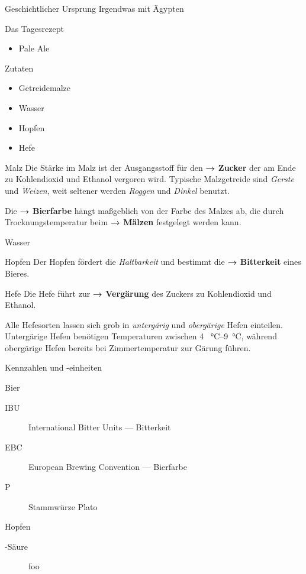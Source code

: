 \documentclass[9pt, ngerman]{beamer}
\newcommand{\forward}[1]{\textbf{→ #1}}
\begin{document}
\begin{frame}{Geschichtlicher Ursprung}
  Irgendwas mit Ägypten
\end{frame}
\begin{frame}{Das Tagesrezept}
  \begin{itemize}
    \item Pale Ale
  \end{itemize}
\end{frame}
\begin{frame}{Zutaten}
  \begin{itemize}
    \item Getreidemalze
    \item Wasser
    \item Hopfen
    \item Hefe
  \end{itemize}
\end{frame}
\begin{frame}{Malz}
  Die Stärke im Malz ist der Ausgangsstoff für den \forward{Zucker} der am Ende
  zu Kohlendioxid und Ethanol vergoren wird. Typische Malzgetreide sind
  \emph{Gerste} und \emph{Weizen}, weit seltener werden \emph{Roggen} und
  \emph{Dinkel} benutzt.

  Die \forward{Bierfarbe} hängt maßgeblich von der Farbe des Malzes ab, die
  durch Trocknungstemperatur beim \forward{Mälzen} festgelegt werden kann.
\end{frame}
\begin{frame}{Wasser}
\end{frame}
\begin{frame}{Hopfen}
  Der Hopfen fördert die \emph{Haltbarkeit} und bestimmt die
  \forward{Bitterkeit} eines Bieres.
\end{frame}
\begin{frame}{Hefe}
  Die Hefe führt zur \forward{Vergärung} des Zuckers zu Kohlendioxid und
  Ethanol.

  Alle Hefesorten lassen sich grob in \emph{untergärig} und \emph{obergärige}
  Hefen einteilen.  Untergärige Hefen benötigen Temperaturen zwischen \SIrange{4
  }{9}{\celsius}, während obergärige Hefen bereits bei Zimmertemperatur zur
  Gärung führen.
\end{frame}
\begin{frame}{Kennzahlen und -einheiten}
  \begin{block}{Bier}
    \begin{description}
      \item[IBU] International Bitter Units --- Bitterkeit
      \item[EBC] European Brewing Convention --- Bierfarbe
      \item[\textdegree P] Stammwürze \textdegree Plato
    \end{description}
  \end{block}

  \begin{block}{Hopfen}
    \begin{description}
      \item[\textalpha-Säure]  foo
    \end{description}
  \end{block}
\end{frame}
\end{document}
